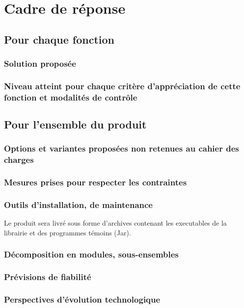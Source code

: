 \section{Cadre de réponse}

\subsection{Pour chaque fonction}

\subsubsection{Solution proposée}
\subsubsection{Niveau atteint pour chaque critère d’appréciation de cette fonction et modalités de contrôle}


\subsection{Pour l’ensemble du produit}

\subsubsection{Options et variantes proposées non retenues au cahier des charges}
%
\subsubsection{Mesures prises pour respecter les contraintes}

\subsubsection{Outils d’installation, de maintenance}

Le produit sera livré sous forme d'archives contenant les executables de la librairie et des programmes témoins (Jar).


\subsubsection{Décomposition en modules, sous-ensembles}
\subsubsection{Prévisions de fiabilité}
\subsubsection{Perspectives d’évolution technologique}
